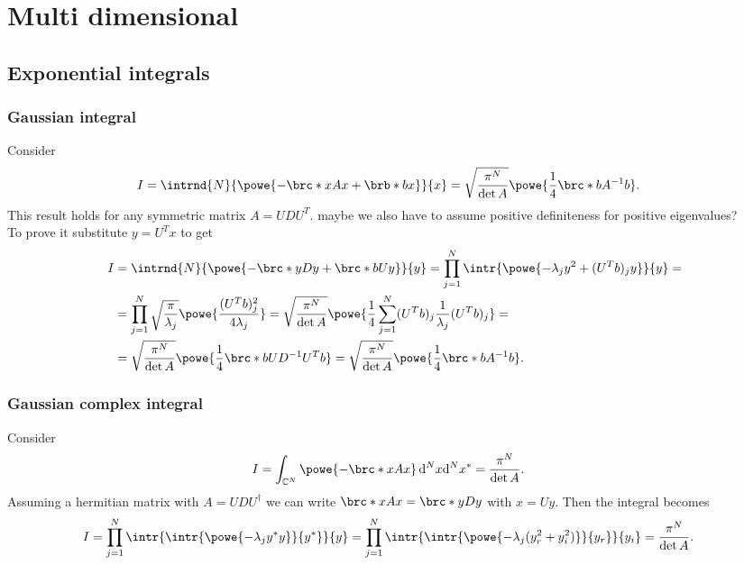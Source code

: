 \documentclass[english, parskip=full]{scrartcl}
\newcommand{\TODO}[1]{\color{red} #1 \color{black}}
\begin{document}
\section{Multi dimensional}
\subsection{Exponential integrals}
\subsubsection{Gaussian integral}
Consider
\begin{align}
I &= \intrnd{N}{\powe{-\brc*{x}{A}{x} + \brb*{b}{x} }}{x} = \sqrt{\frac{\pi^N}{\det A}} \powe{\frac{1}{4} \brc*{b}{A^{-1}}{b} }. \label{eqn:e to the minus x A x plus b x}
\end{align}
This result holds for any symmetric matrix $A=UDU^T$. 
\TODO{maybe we also have to assume positive definiteness for positive eigenvalues?}\\
To prove it substitute $y = U^Tx$ to get
\begin{align}
I &= \intrnd{N}{ \powe{-\brc*{y}{D}{y} + \brc*{b}{U}{y} }}{y} = \prod_{j=1}^N \intr{\powe{-\lambda_j y^2 + (U^Tb)_j y}}{y} = \\
&= \prod_{j=1}^N \sqrt{\frac{\pi}{\lambda_j}}  \powe{\frac{(U^Tb)_j^2}{4\lambda_j}} = \sqrt{\frac{\pi^N}{\det A}} \powe{\frac{1}{4} \sum_{j=1}^N (U^T b)_j \frac{1}{\lambda_j} (U^T b)_j } = \\
&= \sqrt{\frac{\pi^N}{\det A}} \powe{\frac{1}{4} \brc*{b}{UD^{-1} U^T}{b} } = \sqrt{\frac{\pi^N}{\det A}} \powe{\frac{1}{4} \brc*{b}{A^{-1}}{b} }.
\end{align}
\subsubsection{Gaussian complex integral}
Consider
\begin{align}
I &= \int_{\mathbb{C}^N}^{} \powe{-\brc*{x}{A}{x} } \,\mathrm{d}^Nx\mathrm{d}^Nx^\ast = \frac{\pi^N}{\det A}. \label{eqn:e to the minus x ast A x}
\end{align}
Assuming a hermitian matrix with $A=UDU^\dagger$ we can write $\brc*{x}{A}{x } = \brc*{y}{D}{y}$ with $x = Uy$.
Then the integral becomes
\begin{align}
I &= \prod_{j=1}^N \intr{\intr{ \powe{-\lambda_j y^\ast y} }{y^\ast}}{y} = \prod_{j=1}^N \intr{\intr{ \powe{-\lambda_j (y_r^2 + y_i^2)}}{y_r}}{y_i} = \frac{\pi^N}{\det A}.
\end{align}
\end{document}
